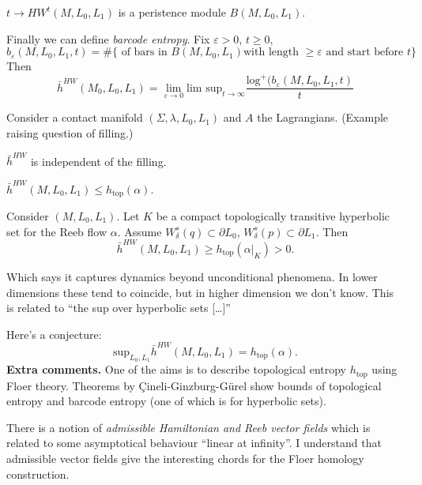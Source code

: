 {\begin{proposition}
\label{proposition-persistence-module}
$t \to HW^t(M,L_0,L_1)$ is a peristence module $B(M,L_0,L_1).$
\end{proposition}

Finally we can define {\it barcode entropy}. Fix $\varepsilon>0$,
$t \geq 0$,
$$
b_\varepsilon(M,L_0,L_1,t)=
\# \{\text{ of bars in }B(M,L_0,L_1) \text{with length $\geq \varepsilon$ 
and start before $t$}\}
$$
Then
$$
\bar{h}^{HW}(M_0,L_0,L_1)=
\lim_{\varepsilon \to 0} \text{lim sup}_{t \to \infty} 
\frac{\text{log}^+(b_\varepsilon(M,L_0,L_1,t)}{t}
$$

\medskip\noindent
Consider a contact manifold $(\Sigma,\lambda,L_0,L_1)$ 
and $A$ the Lagrangians. (Example raising question of filling.)

\begin{theorem}[M '24]
\label{theorem-entropy-is-independent-of-filling}
$\bar{h}^{HW}$ is independent of the filling.
\end{theorem}

\begin{theorem}[M '24]
\label{theorem-bound}
$\bar{h}^{HW}(M,L_0,L_1) \leq  h_{\text{top}}(\alpha)$.
\end{theorem}

\begin{theorem}[M '25]
\label{theorem-restriction}
Consider $(M,L_0,L_1)$. 
Let $K$ be a compact topologically transitive hyperbolic set
for the Reeb flow $\alpha$. Assume $W_\delta ^s (q) \subset \partial L_0$,
$W_\delta^s(p) \subset \partial L_1$. Then
$$
\bar{h}^{HW}(M,L_0,L_1)\geq  h_{\text{top}}(\alpha |_{K})>0.
$$
\end{theorem}
Which says it captures dynamics beyond unconditional phenomena.
In lower dimensions these tend to coincide, but in higher dimension we don't
know. This is related to
 ``the sup over hyperbolic sets […]''

Here's a conjecture:
$$
\text{sup}_{L_0,L_1}\bar{h}^{HW}(M,L_0,L_1)=h_{\text{top}}(\alpha).
$$
\medskip\noindent
{\bf Extra comments.} 
One of the aims is to describe topological entropy $h_\text{top}$ 
using Floer theory. Theorems by Çineli-Ginzburg-Gürel show bounds
of topological entropy and barcode entropy (one of which is for
hyperbolic sets).

There is a notion of  {\it admissible Hamiltonian and Reeb vector fields}
which is related to some asymptotical behaviour  ``linear at infinity''.
I understand that admissible vector fields give 
the interesting chords for the Floer homology construction.

}
